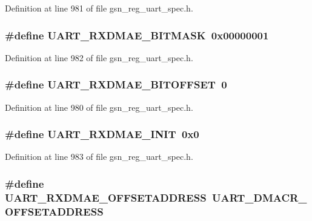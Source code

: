 Definition at line 981 of file gsn\_\-reg\_\-uart\_\-spec.h.

\hypertarget{a00575_a3e4f5fe70b54ca4f459fe65e1ec92d79}{
\subsubsection[{UART\_\-RXDMAE\_\-BITMASK}]{\setlength{\rightskip}{0pt plus 5cm}\#define UART\_\-RXDMAE\_\-BITMASK~0x00000001}}
\label{a00575_a3e4f5fe70b54ca4f459fe65e1ec92d79}


Definition at line 982 of file gsn\_\-reg\_\-uart\_\-spec.h.

\hypertarget{a00575_a51db438592f358bf5fe100b6e60945ec}{
\subsubsection[{UART\_\-RXDMAE\_\-BITOFFSET}]{\setlength{\rightskip}{0pt plus 5cm}\#define UART\_\-RXDMAE\_\-BITOFFSET~0}}
\label{a00575_a51db438592f358bf5fe100b6e60945ec}


Definition at line 980 of file gsn\_\-reg\_\-uart\_\-spec.h.

\hypertarget{a00575_a0780f2a9cd4729cc41ea50111bc25d12}{
\subsubsection[{UART\_\-RXDMAE\_\-INIT}]{\setlength{\rightskip}{0pt plus 5cm}\#define UART\_\-RXDMAE\_\-INIT~0x0}}
\label{a00575_a0780f2a9cd4729cc41ea50111bc25d12}


Definition at line 983 of file gsn\_\-reg\_\-uart\_\-spec.h.

\hypertarget{a00575_a4c2db4541265fb16b859ca10bce80cba}{
\subsubsection[{UART\_\-RXDMAE\_\-OFFSETADDRESS}]{\setlength{\rightskip}{0pt plus 5cm}\#define UART\_\-RXDMAE\_\-OFFSETADDRESS~UART\_\-DMACR\_\-OFFSETADDRESS}}
\label{a00575_a4c2db4541265fb16b859ca10bce80cba}



